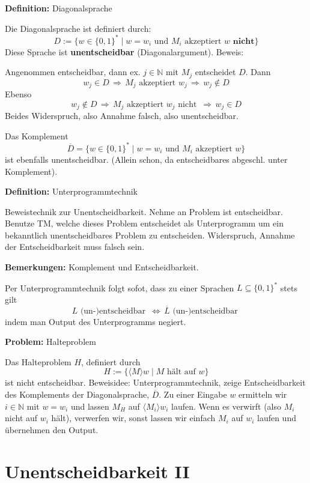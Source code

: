 \documentclass[a4paper,graphics,11pt]{article}
\newcommand{\Iff}[0]{\,\Longleftrightarrow\,}
\begin{document}
\newpage

\textbf{Definition:} Diagonalsprache

Die Diagonalsprache ist definiert durch:
$$
    D := \{w \in \{0,1\}^* \mid w = w_i \text{ und } M_i \text{ akzeptiert } w \textbf{ nicht}\}
$$
Diese Sprache ist \textbf{unentscheidbar} (Diagonalargument). Beweis:

Angenommen entscheidbar, dann ex. $j \in \mathbb{N}$ mit $M_j$ entscheidet $D$. Dann
$$
    w_j \in D \,\Longrightarrow\, M_j \text{ akzeptiert } w_j \,\Longrightarrow\, w_j \notin D
$$
Ebenso
$$
    w_j \notin D \,\Longrightarrow\, M_j \text{ akzeptiert } w_j \text{ nicht }
    \,\Longrightarrow\, w_j \in D
$$
Beides Widerspruch, also Annahme falsch, also unentscheidbar.

Das Komplement
$$
    \overline{D} = \{w \in \{0,1\}^* \mid w = w_i \text{ und } M_i \text{ akzeptiert } w\}
$$
ist ebenfalls unentscheidbar. (Allein schon, da entscheidbares abgeschl. unter Komplement).

\strut

\textbf{Definition:} Unterprogrammtechnik

Beweistechnik zur Unentscheidbarkeit. Nehme an Problem ist entscheidbar. Benutze TM, welche dieses
Problem entscheidet als Unterprogramm um ein bekanntlich unentscheidbares Problem zu entscheiden.
Widerspruch, Annahme der Entscheidbarkeit muss falsch sein.

\strut

\textbf{Bemerkungen:} Komplement und Entscheidbarkeit.

Per Unterprogrammtechnik folgt sofot,
dass zu einer Sprachen $L \subseteq \{0,1\}^*$ stets gilt
$$
    L \text{ (un-)entscheidbar } \Iff \overline{L} \text{ (un-)entscheidbar }
$$
indem man Output des Unterprogramms negiert.

\strut

\textbf{Problem:} Halteproblem

Das Halteproblem $H$, definiert durch
$$
    H := \{\langle M \rangle w \mid M \text{ hält auf } w\}
$$
ist nicht entscheidbar. Beweisidee: Unterprogrammtechnik, zeige Entscheidbarkeit
des Komplements der Diagonalsprache, $\overline{D}$. Zu einer Eingabe $w$ ermitteln
wir $i \in \mathbb{N}$ mit $w = w_i$ und lassen $M_H$ auf $\langle M_i \rangle w_i$ laufen.
Wenn es verwirft (also $M_i$ nicht auf $w_i$ hält), verwerfen wir, sonst lassen wir einfach
$M_i$ auf $w_i$ laufen und übernehmen den Output.

\newpage

\section{Unentscheidbarkeit II}
\end{document}
